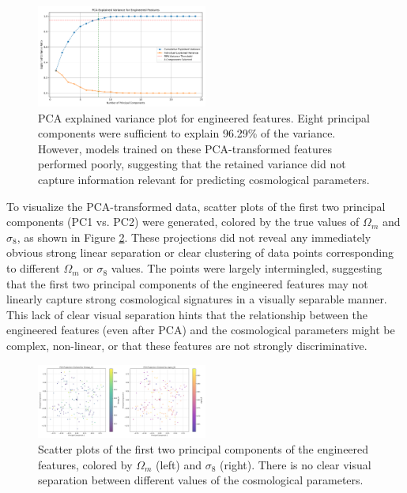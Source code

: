 \documentclass[twocolumn]{aastex631}
\begin{document}
\begin{figure}[h!]
    \centering
    \includegraphics[width=0.5\textwidth]{../input_files/plots/pca_explained_variance_plot_1_20250527-134016.png}
    \caption{PCA explained variance plot for engineered features. Eight principal components were sufficient to explain 96.29\% of the variance. However, models trained on these PCA-transformed features performed poorly, suggesting that the retained variance did not capture information relevant for predicting cosmological parameters.}
    \label{fig:pca_explained_variance}
\end{figure}

To visualize the PCA-transformed data, scatter plots of the first two principal components (PC1 vs. PC2) were generated, colored by the true values of $\Omega_m$ and $\sigma_8$, as shown in Figure \ref{fig:pca_projection}. These projections did not reveal any immediately obvious strong linear separation or clear clustering of data points corresponding to different $\Omega_m$ or $\sigma_8$ values. The points were largely intermingled, suggesting that the first two principal components of the engineered features may not linearly capture strong cosmological signatures in a visually separable manner. This lack of clear visual separation hints that the relationship between the engineered features (even after PCA) and the cosmological parameters might be complex, non-linear, or that these features are not strongly discriminative.

\begin{figure}[h!]
    \centering
    \includegraphics[width=0.5\textwidth]{../input_files/plots/pca_projection_plot_6_20250527-135752.png}
    \caption{Scatter plots of the first two principal components of the engineered features, colored by $\Omega_m$ (left) and $\sigma_8$ (right). There is no clear visual separation between different values of the cosmological parameters.}
    \label{fig:pca_projection}
\end{figure}
\end{document}
